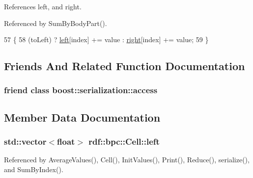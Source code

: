 References left, and right.



Referenced by Sum\+By\+Body\+Part().


\begin{DoxyCode}
57                                                            \{
58       (toLeft) ? \hyperlink{classrdf_1_1bpc_1_1Cell_acca5eb5901f629ff44710f56934dfba2}{left}[index] += value : \hyperlink{classrdf_1_1bpc_1_1Cell_a2d7be4deab042275199ade765509fcea}{right}[index] += value;
59     \}
\end{DoxyCode}


\subsection{Friends And Related Function Documentation}
\subsubsection[{\texorpdfstring{boost\+::serialization\+::access}{boost::serialization::access}}]{\setlength{\rightskip}{0pt plus 5cm}friend class boost\+::serialization\+::access\hspace{0.3cm}{\ttfamily [friend]}}\hypertarget{classrdf_1_1bpc_1_1Cell_ac98d07dd8f7b70e16ccb9a01abf56b9c}{}\label{classrdf_1_1bpc_1_1Cell_ac98d07dd8f7b70e16ccb9a01abf56b9c}


\subsection{Member Data Documentation}
\subsubsection[{\texorpdfstring{left}{left}}]{\setlength{\rightskip}{0pt plus 5cm}std\+::vector$<$float$>$ rdf\+::bpc\+::\+Cell\+::left}\hypertarget{classrdf_1_1bpc_1_1Cell_acca5eb5901f629ff44710f56934dfba2}{}\label{classrdf_1_1bpc_1_1Cell_acca5eb5901f629ff44710f56934dfba2}


Referenced by Average\+Values(), Cell(), Init\+Values(), Print(), Reduce(), serialize(), and Sum\+By\+Index().

